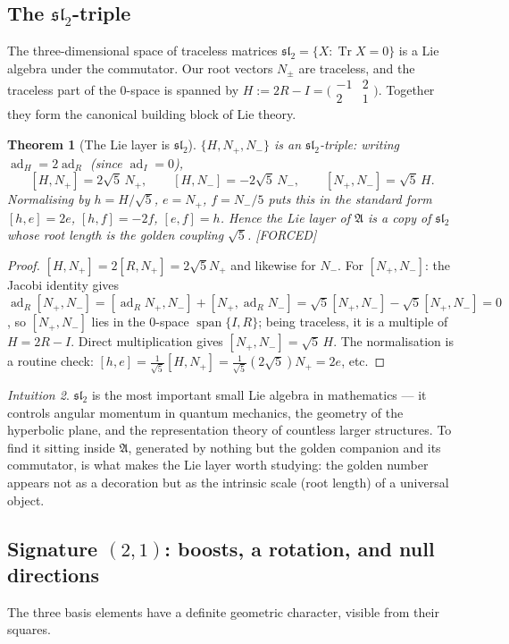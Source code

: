 \documentclass[11pt]{article}
\newcommand{\A}{𝔄}
\theoremstyle{plain}
\newtheorem{theorem}{Theorem}[section]
\theoremstyle{definition}
\theoremstyle{remark}
\newtheorem{intuition}[theorem]{Intuition}
\newcommand{\Forced}{\textcolor{forcedc}{[FORCED]}}
\newcommand{\Tr}{\operatorname{Tr}}
\newcommand{\ad}{\operatorname{ad}}
\begin{document}
\subsection{The $𝔰𝔩_2$-triple}
The three-dimensional space of traceless matrices $𝔰𝔩_2=\{X:\Tr X=0\}$ is a Lie algebra under the commutator. Our root vectors $N_\pm$ are traceless, and the traceless part of the $0$-space is spanned by $H:=2R-I=\bigl(\begin{smallmatrix}-1&2\\2&1\end{smallmatrix}\bigr)$. Together they form the canonical building block of Lie theory.

\begin{theorem}[The Lie layer is $𝔰𝔩_2$]\label{thm:sl2}
$\{H,N_{+},N_{-}\}$ is an $𝔰𝔩_2$-triple: writing $\ad_H=2\ad_R$ (since $\ad_I=0$),
\[
[H,N_{+}]=2\sqrt5\,N_{+},\qquad [H,N_{-}]=-2\sqrt5\,N_{-},\qquad [N_{+},N_{-}]=\sqrt5\,H .
\]
Normalising by $h=H/\sqrt5$, $e=N_{+}$, $f=N_{-}/5$ puts this in the standard form $[h,e]=2e$, $[h,f]=-2f$, $[e,f]=h$. Hence the Lie layer of $\A$ is a copy of $𝔰𝔩_2$ whose \emph{root length is the golden coupling} $\sqrt5$. \Forced
\end{theorem}
\begin{proof}
$[H,N_+]=2[R,N_+]=2\sqrt5 N_+$ and likewise for $N_-$. For $[N_+,N_-]$: the Jacobi identity gives $\ad_R[N_+,N_-]=[\ad_R N_+,N_-]+[N_+,\ad_R N_-]=\sqrt5[N_+,N_-]-\sqrt5[N_+,N_-]=0$, so $[N_+,N_-]$ lies in the $0$-space $\operatorname{span}\{I,R\}$; being traceless, it is a multiple of $H=2R-I$. Direct multiplication gives $[N_+,N_-]=\sqrt5\,H$. The normalisation is a routine check: $[h,e]=\tfrac1{\sqrt5}[H,N_+]=\tfrac1{\sqrt5}(2\sqrt5)N_+=2e$, etc.
\end{proof}

\begin{intuition}
$𝔰𝔩_2$ is the most important small Lie algebra in mathematics --- it controls angular momentum in quantum mechanics, the geometry of the hyperbolic plane, and the representation theory of countless larger structures. To find it sitting inside $\A$, generated by nothing but the golden companion and its commutator, is what makes the Lie layer worth studying: the golden number appears not as a decoration but as the intrinsic scale (root length) of a universal object.
\end{intuition}

\subsection{Signature $(2,1)$: boosts, a rotation, and null directions}
The three basis elements have a definite geometric character, visible from their squares.
\end{document}

